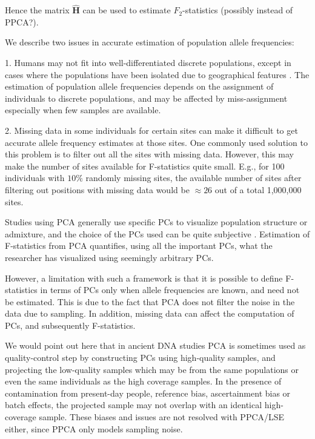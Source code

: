 \documentclass[12pt, letterpaper]{article}
\begin{document}
Hence the matrix $\hat{\mathbf{H}}$ can be used to estimate $F_2$-statistics (possibly instead of PPCA?).



We describe two issues in accurate estimation of population allele frequencies:

1. Humans may not fit into well-differentiated discrete populations, except in cases where the populations have been isolated due to geographical features \cite{novembre_genes_2008}. The estimation of population allele frequencies depends on the assignment of individuals to discrete populations, and may be affected by miss-assignment especially when few samples are available. 

2. Missing data in some individuals for certain sites can make it difficult to get accurate allele frequency estimates at those sites. One commonly used solution to this problem is to filter out all the sites with missing data. However, this may make the number of sites available for F-statistics quite small. E.g., for 100 individuals with $10\%$ randomly missing sites, the available number of sites after filtering out positions with missing data would be $\approx26$ out of a total 1,000,000 sites. 

Studies using PCA generally use specific PCs to visualize population structure or admixture, and the choice of the PCs used can be quite subjective \cite{elhaik_principal_2022}. Estimation of F-statistics from PCA quantifies, using all the important PCs, what the researcher has visualized using seemingly arbitrary PCs.

However, a limitation with such a framework is that it is possible to define F-statistics in terms of PCs only when allele frequencies are known, and need not be estimated. This is due to the fact that PCA does not filter the noise in the data due to sampling. In addition, missing data can affect the computation of PCs, and subsequently F-statistics.


We would point out here that in ancient DNA studies PCA is sometimes used as quality-control step by constructing PCs using high-quality samples, and projecting the low-quality samples which may be from the same populations or even the same individuals as the high coverage samples. In the presence of contamination from present-day people, reference bias, ascertainment bias or batch effects, the projected sample may not overlap with an identical high-coverage sample. These biases and issues are not resolved with PPCA/LSE either, since PPCA only models sampling noise. 
\end{document}

